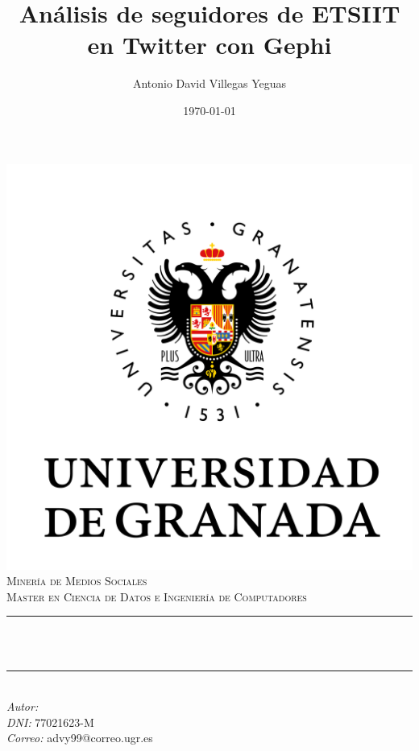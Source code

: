 \documentclass[12pt, spanish]{article}
\title{Análisis de seguidores de ETSIIT en Twitter con Gephi}
\author{Antonio David Villegas Yeguas}
\date{\today}
\makeatletter
\let\thetitle\@title
\let\theauthor\@author
\makeatother
\begin{document}


\begin{titlepage}
    \centering
    \vspace*{-2cm}
    \includegraphics[scale = 0.50]{ugr.png}\\[0.3 cm]
    \textsc{\large Minería de Medios Sociales}\\[0.5 cm]
    \textsc{\large Master en Ciencia de Datos e Ingeniería de Computadores}\\[0 cm]
    \rule{\linewidth}{0.2 mm} \\[0.4cm]
    { \Large \bfseries \thetitle}\\
    \rule{\linewidth}{0.2 mm} \\[1 cm]

     {\large
      \emph{Autor: } \theauthor\\
	   \emph{DNI:   }  77021623-M \\
      \emph{Correo:} advy99@correo.ugr.es}


\end{titlepage}
\end{document}
